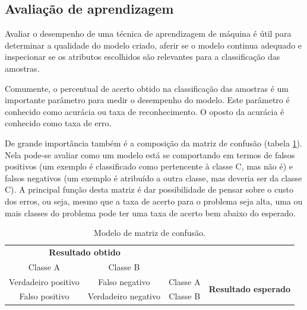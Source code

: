 \subsection{Avaliação de aprendizagem}\label{sec:avaliacao}

Avaliar o desempenho de uma técnica de aprendizagem de máquina é útil para determinar a qualidade do modelo criado, aferir se o modelo continua adequado e inspecionar se os atributos escolhidos são relevantes para a classificação das amostras.

Comumente, o percentual de acerto obtido na classificação das amostras é um importante parâmetro para medir o desempenho do modelo. Este parâmetro é conhecido como acurácia ou taxa de reconhecimento. O oposto da acurácia é conhecido como taxa de erro.

De grande importância também é a composição da matriz de confusão (tabela \ref{tab:matrixConfusao}). Nela pode-se avaliar como um modelo está se comportando em termos de falsos positivos (um exemplo é classificado como pertencente à classe C, mas não é) e falsos negativos (um exemplo é atribuído a outra classe, mas deveria ser da classe C). A principal função desta matriz é dar possibilidade de pensar sobre o custo dos erros, ou seja, mesmo que a taxa de acerto para o problema seja alta, uma ou mais classes do problema pode ter uma taxa de acerto bem abaixo do esperado.

\begin{table}[h]
  \centering
  \begin{tabular}{cccc}
  \multicolumn{2}{c}{\textbf{Resultado obtido}}                  &                               &                                              \\ \cline{1-2}
  \multicolumn{1}{|c|}{Classe A} & \multicolumn{1}{c|}{Classe B} &                               &                                              \\ \cline{1-3}
  \multicolumn{1}{|c|}{Verdadeiro positivo}       & \multicolumn{1}{c|}{Falso negativo}       & \multicolumn{1}{c|}{Classe A} & \multirow{2}{*}{\textbf{Resultado esperado}} \\ \cline{1-3}
  \multicolumn{1}{|c|}{Falso positivo}       & \multicolumn{1}{c|}{Verdadeiro negativo}       & \multicolumn{1}{c|}{Classe B} &                                              \\ \cline{1-3}
  \end{tabular}
  \caption{Modelo de matriz de confusão.}
  \label{tab:matrixConfusao}
\end{table}

